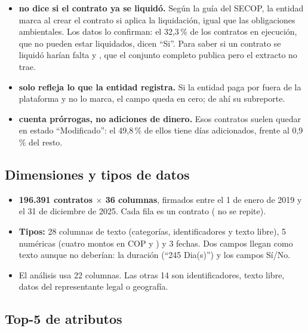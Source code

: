 \documentclass[11pt,a4paper]{article}
\begin{document}
\begin{itemize}
  \item \textbf{ no dice si el contrato ya se liquidó.} Según la guía del SECOP, la entidad marca
    al crear el contrato si aplica la liquidación, igual que las obligaciones ambientales. Los datos lo confirman:
    el 32,3\,\% de los contratos en ejecución, que no pueden estar liquidados, dicen \enquote{Si}. Para saber si un
    contrato se liquidó harían falta  y , que el
    conjunto completo publica pero el extracto no trae.
  \item \textbf{ solo refleja lo que la entidad registra.} Si la entidad paga por fuera de la
    plataforma y no lo marca, el campo queda en cero; de ahí su subreporte.
  \item \textbf{ cuenta prórrogas, no adiciones de dinero.} Esos contratos suelen quedar en
    estado \enquote{Modificado}: el 49,8\,\% de ellos tiene días adicionados, frente al 0,9\,\% del resto.
\end{itemize}

\subsection{Dimensiones y tipos de datos}

\begin{itemize}
  \item \textbf{196.391 contratos $\times$ 36 columnas}, firmados entre el 1 de enero de 2019 y el 31 de
    diciembre de 2025. Cada fila es un contrato ( no se repite).
  \item \textbf{Tipos:} 28 columnas de texto (categorías, identificadores y texto libre), 5 numéricas (cuatro
    montos en COP y ) y 3 fechas. Dos campos llegan como texto aunque no deberían: la
    duración (\enquote{245 Dia(s)}) y los campos Sí/No.
  \item El análisis usa 22 columnas. Las otras 14 son identificadores, texto libre, datos del representante legal
    o geografía.
\end{itemize}

\subsection{Top-5 de atributos}
\end{document}
